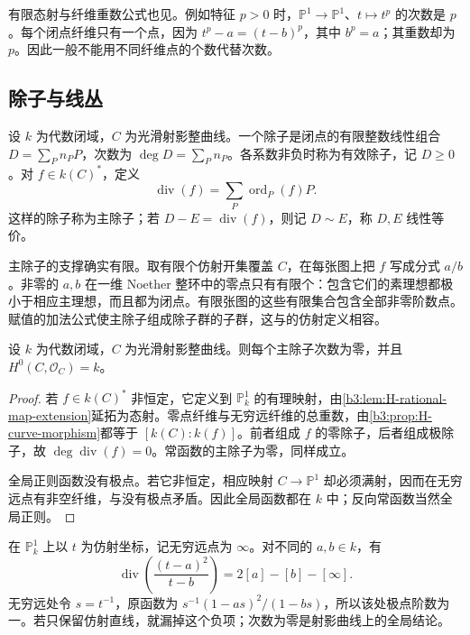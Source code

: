 有限态射与纤维重数公式也见\cite[Chapter II, Propositions 6.8--6.9, pp. 137--138]{Hartshorne1977}。例如特征 \(p>0\) 时，\(\mathbb P^1\rightarrow\mathbb P^1\)、\(t\mapsto t^p\) 的次数是 \(p\)。每个闭点纤维只有一个点，因为 \(t^p-a=(t-b)^p\)，其中 \(b^p=a\)；其重数却为 \(p\)。因此一般不能用不同纤维点的个数代替次数。

\subsection{除子与线丛}
\label{b3:subsec:H01:02}

\begin{definition}\label{b3:def:H-curve-divisor}
	设 \(k\) 为代数闭域，\(C\) 为光滑射影整曲线。一个除子是闭点的有限整数线性组合 \(D=\sum_P n_PP\)，次数为 \(\deg D=\sum_Pn_P\)。各系数非负时称为有效除子，记 \(D\ge0\)。对 \(f\in k(C)^*\)，定义
	\[
		\operatorname{div}(f)=\sum_P\operatorname{ord}_P(f)P.
	\]
	这样的除子称为主除子；若 \(D-E=\operatorname{div}(f)\)，则记 \(D\sim E\)，称 \(D,E\) 线性等价。
\end{definition}

主除子的支撑确实有限。取有限个仿射开集覆盖 \(C\)，在每张图上把 \(f\) 写成分式 \(a/b\)。非零的 \(a,b\) 在一维 Noether 整环中的零点只有有限个：包含它们的素理想都极小于相应主理想，而且都为闭点。有限张图的这些有限集合包含全部非零阶数点。赋值的加法公式使主除子组成除子群的子群，这与的仿射定义相容。

\begin{corollary}\label{b3:cor:H-principal-degree}
	设 \(k\) 为代数闭域，\(C\) 为光滑射影整曲线。则每个主除子次数为零，并且 \(H^0(C,\mathcal O_C)=k\)。
\end{corollary}
\begin{proof}
	若 \(f\in k(C)^*\) 非恒定，它定义到 \(\mathbb P_k^1\) 的有理映射，由\cref{b3:lem:H-rational-map-extension}延拓为态射。零点纤维与无穷远纤维的总重数，由\cref{b3:prop:H-curve-morphism}都等于 \([k(C):k(f)]\)。前者组成 \(f\) 的零除子，后者组成极除子，故 \(\deg\operatorname{div}(f)=0\)。常函数的主除子为零，同样成立。

	全局正则函数没有极点。若它非恒定，相应映射 \(C\rightarrow\mathbb P^1\) 却必须满射，因而在无穷远点有非空纤维，与没有极点矛盾。因此全局函数都在 \(k\) 中；反向常函数当然全局正则。
\end{proof}

在 \(\mathbb P_k^1\) 上以 \(t\) 为仿射坐标，记无穷远点为 \(\infty\)。对不同的 \(a,b\in k\)，有
\[
	\operatorname{div}\!\left(\frac{(t-a)^2}{t-b}\right)=2[a]-[b]-[\infty].
\]
无穷远处令 \(s=t^{-1}\)，原函数为 \(s^{-1}(1-as)^2/(1-bs)\)，所以该处极点阶数为一。若只保留仿射直线，就漏掉这个负项；次数为零是射影曲线上的全局结论。

